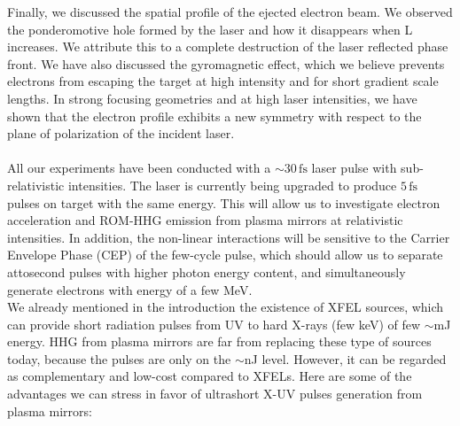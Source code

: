 \indent Finally, we discussed the spatial profile of the ejected electron beam. We observed the ponderomotive hole formed by the laser and how it disappears when L increases. We attribute this to a complete destruction of the laser reflected phase front. We have also discussed the gyromagnetic effect, which we believe prevents electrons from escaping the target at high intensity and for short gradient scale lengths. In strong focusing geometries and at high laser intensities, we have shown that the electron profile exhibits a new symmetry with respect to the plane of polarization of the incident laser.\\



\noindent {}\\

All our experiments  have been conducted with a $\sim 30\,\mathrm{fs}$ laser pulse with sub-relativistic intensities. The laser is currently being upgraded to produce $5\,\mathrm{fs}$ pulses on target with the same energy. This will allow us to investigate electron acceleration and ROM-HHG emission from plasma mirrors at relativistic intensities. In addition, the non-linear interactions will be sensitive to the Carrier Envelope Phase (CEP) of the few-cycle pulse, which should allow us to separate attosecond pulses with higher photon energy content, and simultaneously generate electrons with energy of a few MeV. \\


\noindent We already mentioned in the introduction the existence of XFEL sources, which can provide short radiation pulses from UV to hard X-rays (few keV) of few $\sim$mJ energy. HHG from plasma mirrors are far from replacing these type of sources today, because the pulses are only on the $\sim$nJ level. However, it can be regarded as complementary and low-cost compared to XFELs. Here are some of the advantages we can stress in favor of ultrashort X-UV pulses generation from plasma mirrors:\\

